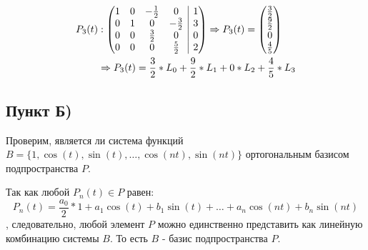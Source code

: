 \documentclass[12pt, a4paper]{article}
\begin{document}
\begin{equation*}
\begin{aligned}
P_3(t)&: \left(
\begin{array}{@{}cccc|c@{}}
1 & 0 & -\frac{1}{2} & 0 & 1\\
0 & 1 & 0 & -\frac{3}{2} & 3\\
0  & 0 & \frac{3}{2} & 0  & 0\\
0  & 0 & 0 & \frac{5}{2}  & 2\\
\end{array}
\right)  \Rightarrow P_3(t) = \begin{pmatrix}
\frac{3}{2}\\
\frac{9}{2}\\
0\\
\frac{4}{5}
\end{pmatrix}\\
 & \Rightarrow P_3(t) = \frac{3}{2}*L_0 + \frac{9}{2}*L_1 + 0*L_2 + \frac{4}{5}*L_3
\end{aligned}
\end{equation*}
\subsection{Пункт Б)}
Проверим, является ли система функций $B=\{1, \cos(t), \sin(t), \ldots, \cos(nt), \sin(nt)\}$ ортогональным базисом подпространства $P$.

Так как любой $P_n(t) \in P$ равен:
\begin{equation*}
P_n(t)=\frac{a_0}{2} * 1 + a_1\cos(t)+b_1\sin(t)+\ldots+a_n\cos(nt)+b_n\sin(nt)
\end{equation*},
следовательно, любой элемент $P$ можно единственно представить как линейную комбинацию системы $B$. То есть $B$ - базис подпространства  $P$.
\end{document}
